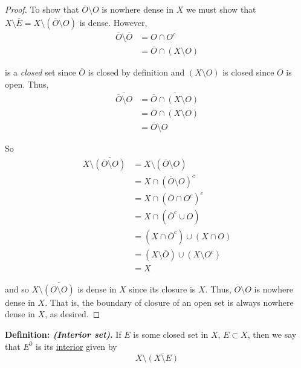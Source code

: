 \documentclass[12pt]{article}
\begin{document}
\begin{proof} To show that $\overline{O}\setminus O$ is nowhere dense in $X$ we must show that $X\setminus \overline{E} = X\setminus \overline{\left( \overline{O}\setminus O \right)}$ is dense. However,
\begin{align*}
	\overline{O} \setminus \overline{O} &= O \cap O^c \\
	&= \overline{O} \cap \left(X\setminus O\right)
\end{align*}

is a {\em closed} set since $\overline{O}$ is closed by definition and $\left(X\setminus O\right)$ is closed since $O$ is open. Thus,
\begin{align*}
	\overline{\overline{O} \setminus O} &= \overline{\overline{O} \cap \left(X\setminus O\right)} \\
	&= \overline{O} \cap \left(X\setminus O\right) \\
	&= \overline{O} \setminus O
\end{align*} 

So
\begin{align*}
	X\setminus \overline{\left( \overline{O}\setminus O \right)} &= X \setminus \left( \overline{O} \setminus O \right) \\
	&= X \cap \left( \overline{O} \setminus O \right)^c \\
	&= X \cap \left( \overline{O} \cap O^c \right)^c \\
	&= X \cap \left( \overline{O}^c \cup O \right) \\	
	&= \left( X \cap \overline{O}^c \right) \cup \left( X \cap O \right) \\
	&= \left( X \setminus \overline{O} \right) \cup \left( X \setminus O^c \right) \\
	&= X	
\end{align*}

and so $X\setminus \overline{\left( \overline{O}\setminus O \right)}$ is dense in $X$ since its closure is $X$. Thus, $\overline{O}\setminus O$ is nowhere dense in $X$. That is, the boundary of closure of an open set is always nowhere dense in $X$, as desired.
\end{proof}

%
%
{\bf Definition: {\em (Interior set)}.} If $E$ is some closed set in $X$, $E \subset X$, then we say that $E^0$ is its \underline{interior} given by
\begin{equation*}
	X \setminus \overline{\left(X\setminus E\right)}
\end{equation*}
\end{document}
